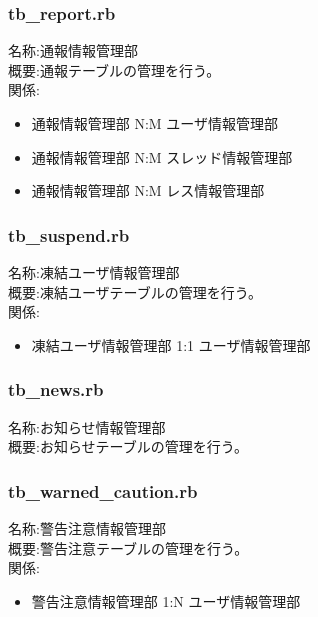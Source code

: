 \documentclass[a4j]{jarticle}
\begin{document}
\subsubsection{tb\_report.rb}
  \noindent 
  名称:通報情報管理部\\
  概要:通報テーブルの管理を行う。\\
  関係:  
  \begin{itemize}
  \item 通報情報管理部 N:M ユーザ情報管理部
  \item 通報情報管理部 N:M スレッド情報管理部
  \item 通報情報管理部 N:M レス情報管理部
  \end{itemize}



\subsubsection{tb\_suspend.rb}
  \noindent 
  名称:凍結ユーザ情報管理部\\
  概要:凍結ユーザテーブルの管理を行う。\\
  関係:  
  \begin{itemize}
  \item 凍結ユーザ情報管理部 1:1 ユーザ情報管理部
  \end{itemize}

\subsubsection{tb\_news.rb}
  \noindent 
  名称:お知らせ情報管理部\\
  概要:お知らせテーブルの管理を行う。\\
  
\subsubsection{tb\_warned\_caution.rb}
  \noindent 
  名称:警告注意情報管理部\\
  概要:警告注意テーブルの管理を行う。\\
  関係:  
  \begin{itemize}
  \item 警告注意情報管理部 1:N ユーザ情報管理部
  \end{itemize}   



\appendix
\end{document}
